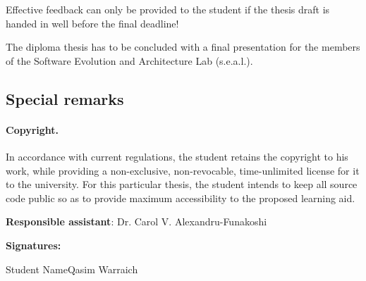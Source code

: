 \documentclass{task_description}
\begin{document}
Effective feedback can only be provided to the student if the thesis draft is handed in well before the final deadline!

The diploma thesis has to be concluded with a final presentation for the members
of the Software Evolution and Architecture Lab (s.e.a.l.).

\subsection*{Special remarks}
\paragraph{Copyright.}
In accordance with current regulations, the student retains the copyright to his work, while providing a non-exclusive, non-revocable, time-unlimited license for it to the university. For this particular thesis, the student intends to keep all source code public so as to provide maximum accessibility to the proposed learning aid. 

\vspace{2em}
\noindent\textbf{Responsible assistant}: Dr. Carol V. Alexandru-Funakoshi

\vspace{2em}
\noindent\textbf{Signatures:}

\vspace{3\baselineskip}
\noindent Student Name\hfill Qasim Warraich
\vspace{2cm}


\end{document}
